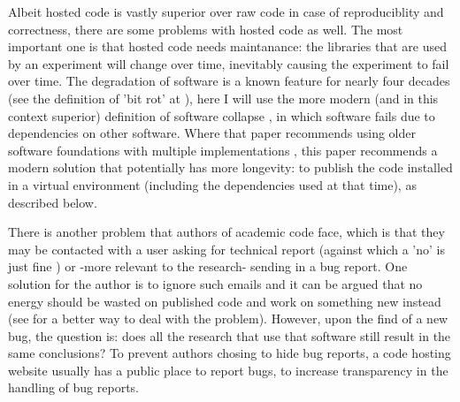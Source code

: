 Albeit hosted code is vastly superior over raw code
in case of reproduciblity and correctness,
there are some problems with hosted code as well.
The most important one is that hosted code needs maintanance:
the libraries that are used by an experiment
will change over time, inevitably causing the experiment to fail
over time. 
The degradation of software is a known feature for nearly 
four decades (see the definition of 'bit rot' at \cite{steele1983hacker}),
here I will use the more modern (and in this context superior)
definition of software collapse \cite{hinsen2019dealing},
in which software fails due to dependencies on other 
software.
Where that paper recommends using older software foundations 
with multiple implementations \cite{hinsen2019dealing},
this paper recommends a modern solution that potentially has more longevity:
to publish the code installed in a virtual environment
(including the dependencies used at that time), as described below.

There is another problem that authors of academic code face,
which is that they may be contacted with a user 
asking for technical report 
(against which a 'no' is just fine \cite{barnes2010publish})
or -more relevant to the research- sending in a bug report.
One solution for the author is to ignore such emails
and it can be argued that no energy should be wasted on published code
and work on something new instead 
(see \cite{barnes2010publish} for a better way to deal with the problem).
However, upon the find of a new bug, the question is:
does all the research that use that software still 
result in the same conclusions?
To prevent authors chosing to hide bug reports, 
a code hosting website usually has a public place to report bugs,
to increase transparency in the handling of bug reports.

